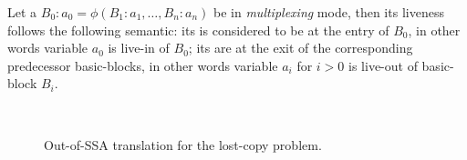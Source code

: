 \begin{definition}
Let a \phifun $B_0:a_0=\phi(B_1:a_1,\dots,B_n:a_n)$ be in \emph{multiplexing} mode, then its liveness follows the following semantic: its  is considered to be at the entry of $B_0$, in other words variable $a_0$ is live-in of $B_0$; its \useops are at the exit of the corresponding predecessor basic-blocks, in other words variable $a_i$ for $i>0$ is live-out of basic-block $B_i$.
\end{definition}


\begin{figure}[H]
\hfill
{}
\hfill
\begin{minipage}[b]{0.2\textwidth}
  \\
\end{minipage}
\hfill
{}
\caption{Out-of-SSA translation for the lost-copy problem.\label{fig:alternative_ssa_destruction:ex_lost}}
\end{figure}

